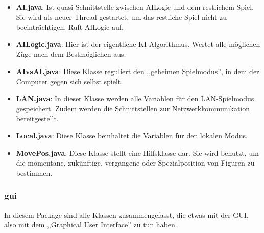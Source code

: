 \documentclass[12pt,a4paper]{article}
\begin{document}
\begin{itemize}

	\item{\textbf{AI.java}: Ist quasi Schnittstelle zwischen AILogic und dem restlichem Spiel. Sie wird als neuer Thread gestartet, um das restliche Spiel nicht zu beeinträchtigen. Ruft AILogic auf.}
	
	\item{\textbf{AILogic.java}: Hier ist der eigentliche KI-Algorithmus. Wertet alle möglichen Züge nach dem Bestmöglichen aus.}

	\item{\textbf{AIvsAI.java}: Diese Klasse reguliert den ,,geheimen Spielmodus'', in dem der Computer gegen sich selbst spielt. }
	
	\item{\textbf{LAN.java}: In dieser Klasse werden alle Variablen für den LAN-Spielmodus gespeichert. Zudem werden die Schnittstellen zur Netzwerkkommunikation bereitgestellt.}
	
	\item{\textbf{Local.java}: Diese Klasse beinhaltet die Variablen für den lokalen Modus. }

	\item{\textbf{MovePos.java}: Diese Klasse stellt eine Hilfsklasse dar. Sie wird benutzt, um die momentane, zukünftige, vergangene oder Spezialposition von Figuren zu bestimmen.}

\end{itemize}

\subsubsection{gui}

In diesem Package sind alle Klassen zusammengefasst, die etwas mit der GUI, also mit dem ,,Graphical User Interface'' zu tun haben. 
\end{document}
